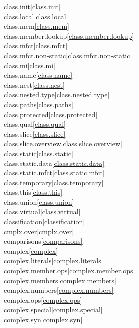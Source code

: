 \begin{multicols}{2}
class.init\quad\ref{class.init}\\
class.local\quad\ref{class.local}\\
class.mem\quad\ref{class.mem}\\
class.member.lookup\quad\ref{class.member.lookup}\\
class.mfct\quad\ref{class.mfct}\\
class.mfct.non-static\quad\ref{class.mfct.non-static}\\
class.mi\quad\ref{class.mi}\\
class.name\quad\ref{class.name}\\
class.nest\quad\ref{class.nest}\\
class.nested.type\quad\ref{class.nested.type}\\
class.paths\quad\ref{class.paths}\\
class.protected\quad\ref{class.protected}\\
class.qual\quad\ref{class.qual}\\
class.slice\quad\ref{class.slice}\\
class.slice.overview\quad\ref{class.slice.overview}\\
class.static\quad\ref{class.static}\\
class.static.data\quad\ref{class.static.data}\\
class.static.mfct\quad\ref{class.static.mfct}\\
class.temporary\quad\ref{class.temporary}\\
class.this\quad\ref{class.this}\\
class.union\quad\ref{class.union}\\
class.virtual\quad\ref{class.virtual}\\
classification\quad\ref{classification}\\
cmplx.over\quad\ref{cmplx.over}\\
comparisons\quad\ref{comparisons}\\
complex\quad\ref{complex}\\
complex.literals\quad\ref{complex.literals}\\
complex.member.ops\quad\ref{complex.member.ops}\\
complex.members\quad\ref{complex.members}\\
complex.numbers\quad\ref{complex.numbers}\\
complex.ops\quad\ref{complex.ops}\\
complex.special\quad\ref{complex.special}\\
complex.syn\quad\ref{complex.syn}\\

\end{multicols}
